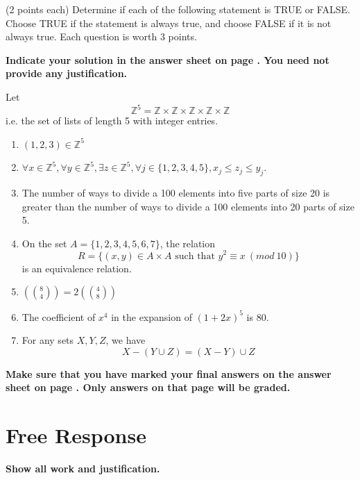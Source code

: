 \documentclass[12pt]{article}
\begin{document}
(2 points each) Determine if each of the following statement is TRUE or FALSE.\\Choose TRUE if the statement is always true, and choose FALSE if it is not always true. Each question is worth 3 points.

\vspace{0.2cm}

\noindent
\textbf{Indicate your solution in the answer sheet on page \pageref{answersheet}.  You need not provide any justification.}

Let
\[
\mathbb{Z}^5=\mathbb{Z}\times\mathbb{Z}\times\mathbb{Z}\times\mathbb{Z}\times \mathbb{Z}
\]
i.e. the set of lists of length 5 with integer entries.
\begin{enumerate}
\item $(1,2,3)\in\mathbb{Z}^5$
\item $\forall x\in \mathbb{Z}^5,\forall y\in\mathbb{Z}^5,\exists z\in\mathbb{Z}^5,\forall j\in \{1,2,3,4,5\}, x_j\leq z_j\leq y_j$.
\item The number of ways to divide a 100 elements into five parts of size 20 is greater than the number of ways to divide a 100 elements into 20 parts of size 5.
\item On the set $A=\{1,2,3,4,5,6,7\}$, the relation 
\[
R=\{(x,y)\in A\times A\textrm{ such that }y^2 \equiv x~(mod~10)\}
\]
is an equivalence relation.
\item $\left(\binom{8}{4}\right)=2\left(\binom{4}{8}\right)$
\item The coefficient of $x^4$ in the expansion of $(1+2x)^5$ is $80$.

\item For any sets $X,Y,Z$, we have
\[
X-(Y\cup Z)=(X-Y)\cup Z
\]


\end{enumerate}
\begin{center}
\textbf{Make sure that you have marked your final answers on the answer sheet on page \pageref{answersheet}. Only answers on that page will be graded.}
\end{center}
\newpage
\section*{Free Response}

\textbf{Show all work and justification.} 
\end{document}
